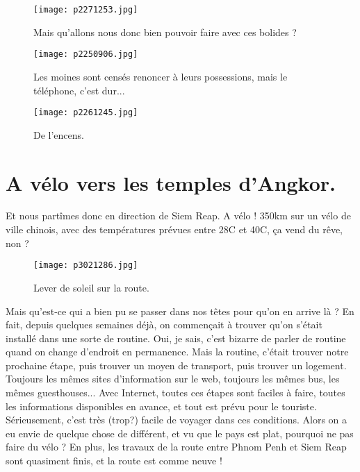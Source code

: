 \documentclass{book}
\begin{document}
\begin{figure}[h]
\centering
\texttt{[image: p2271253.jpg]}
\caption*{Mais qu'allons nous donc bien pouvoir faire avec ces bolides ?}
\end{figure}


\begin{figure}[h]
\centering
\texttt{[image: p2250906.jpg]}
\caption*{Les moines sont censés renoncer à leurs possessions, mais le téléphone, c'est dur...}
\end{figure}


\begin{figure}[h]
\centering
\texttt{[image: p2261245.jpg]}
\caption*{De l’encens.}
\end{figure}



\chapter{A vélo vers les temples d'Angkor.}
Et nous partîmes donc en direction de Siem Reap. A vélo ! 350km sur un vélo de ville chinois, avec des températures prévues entre 28\textdegree C et 40\textdegree C, ça vend du rêve, non ?


\begin{figure}[h]
\centering
\texttt{[image: p3021286.jpg]}
\caption*{Lever de soleil sur la route.}
\end{figure}

Mais qu'est-ce qui a bien pu se passer dans nos têtes pour qu'on en arrive là ? En fait, depuis quelques semaines déjà, on commençait à trouver qu'on s'était installé dans une sorte de routine. Oui, je sais, c'est bizarre de parler de routine quand on change d'endroit en permanence. Mais la routine, c'était trouver notre prochaine étape, puis trouver un moyen de transport, puis trouver un logement. Toujours les mêmes sites d'information sur le web, toujours les mêmes bus, les mêmes guesthouses... Avec Internet, toutes ces étapes sont faciles à faire, toutes les informations disponibles en avance, et tout est prévu pour le touriste. Sérieusement, c'est très (trop?) facile de voyager dans ces conditions. Alors on a eu envie de quelque chose de différent, et vu que le pays est plat, pourquoi ne pas faire du vélo ? En plus, les travaux de la route entre Phnom Penh et Siem Reap sont quasiment finis, et la route est comme neuve !
\end{document}
